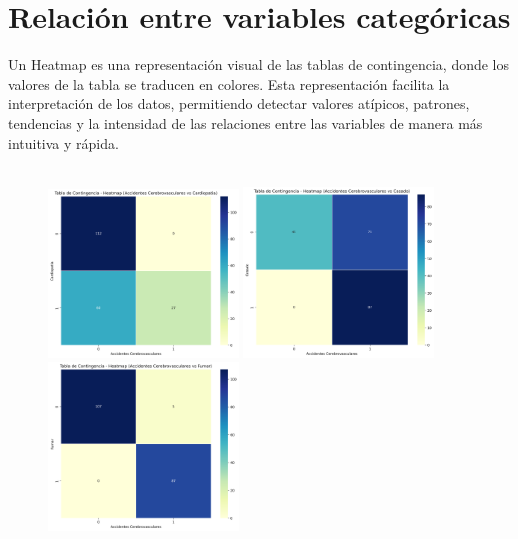 \documentclass[a4paper, 12pt]{article}
\begin{document}
\section{Relación entre variables categóricas}
Un Heatmap es una representación visual de las tablas de contingencia, donde los valores de la tabla se traducen en colores. Esta representación facilita la interpretación de los datos, permitiendo detectar valores atípicos, patrones, tendencias y la intensidad de las relaciones entre las variables de manera más intuitiva y rápida.
\\ \\
\begin{figure}[H]
    \centering
    \includegraphics[width=0.45\textwidth]{img/Heatmap/Accidentes_Cardiopatia.png} \hspace{0.5cm}
    \includegraphics[width=0.45\textwidth]{img/Heatmap/Accidentes_Casado.png} \vspace{0.5cm}
    \vspace{0.3cm}
    \includegraphics[width=0.45\textwidth]{img/Heatmap/Accidentes_Fumar.png} \hspace{0.5cm}

\end{figure}
\end{document}
